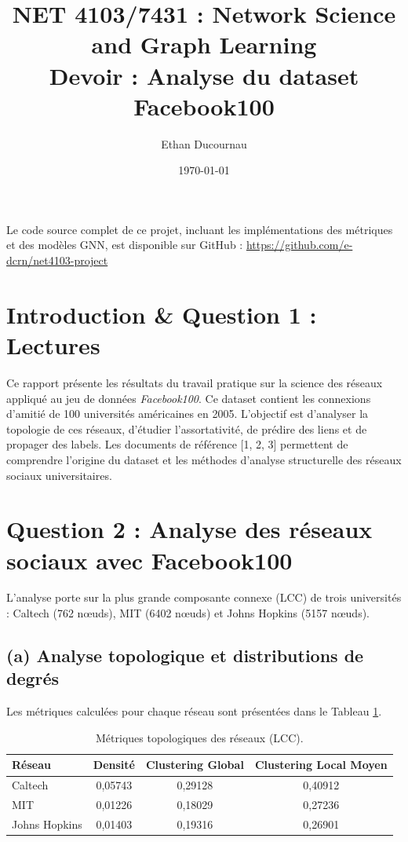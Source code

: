 \documentclass[a4paper,11pt]{article}
\title{NET 4103/7431 : Network Science and Graph Learning \\ \large Devoir : Analyse du dataset Facebook100}
\author{Ethan Ducournau}
\date{\today}
\begin{document}
\maketitle

Le code source complet de ce projet, incluant les implémentations des métriques et des modèles GNN, est disponible sur GitHub : \url{https://github.com/e-dcrn/net4103-project}

\section{Introduction \& Question 1 : Lectures}
Ce rapport présente les résultats du travail pratique sur la science des réseaux appliqué au jeu de données \textit{Facebook100}. Ce dataset contient les connexions d'amitié de 100 universités américaines en 2005. L'objectif est d'analyser la topologie de ces réseaux, d'étudier l'assortativité, de prédire des liens et de propager des labels.
Les documents de référence [1, 2, 3] permettent de comprendre l'origine du dataset et les méthodes d'analyse structurelle des réseaux sociaux universitaires.

\section{Question 2 : Analyse des réseaux sociaux avec Facebook100}
L'analyse porte sur la plus grande composante connexe (LCC) de trois universités : Caltech (762 nœuds), MIT (6402 nœuds) et Johns Hopkins (5157 nœuds).

\subsection{(a) Analyse topologique et distributions de degrés}
Les métriques calculées pour chaque réseau sont présentées dans le Tableau \ref{tab:metrics}.

\begin{table}[h]
    \centering
    \caption{Métriques topologiques des réseaux (LCC).}
    \label{tab:metrics}
    \begin{tabular}{lccc}
        \toprule
        \textbf{Réseau} & \textbf{Densité} & \textbf{Clustering Global} & \textbf{Clustering Local Moyen} \\
        \midrule
        Caltech       & 0,05743 & 0,29128 & 0,40912 \\
        MIT           & 0,01226 & 0,18029 & 0,27236 \\
        Johns Hopkins & 0,01403 & 0,19316 & 0,26901 \\
        \bottomrule
    \end{tabular}
\end{table}
\end{document}
